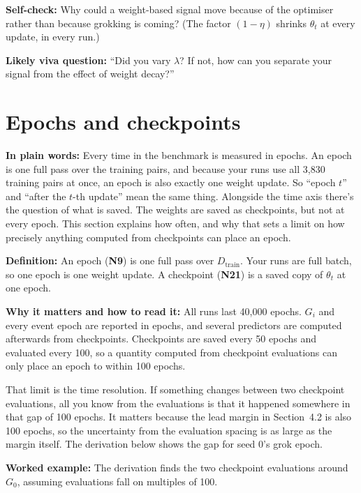 \documentclass[11pt,a4paper,oneside,openany]{report}
\newcommand{\Dtrain}{D_{\mathrm{train}}}
\newcommand{\gl}[1]{\textbf{#1}}   %
\newcommand{\fplain}{\textbf{In plain words:} }
\newcommand{\fdef}{\textbf{Definition:} }
\newcommand{\fread}{\par\textbf{Why it matters and how to read it:} }
\newcommand{\fex}{\par\textbf{Worked example:} }
\newcommand{\fself}{\par\textbf{Self-check:} }
\newcommand{\fviva}{\par\textbf{Likely viva question:} }
\begin{document}
\fself Why could a weight-based signal move because of the optimiser rather than because grokking is coming? (The factor $(1 - \eta)$ shrinks $\theta_t$ at every update, in every run.)
\fviva ``Did you vary $\lambda$? If not, how can you separate your signal from the effect of weight decay?''

\section{Epochs and checkpoints}
\fplain Every time in the benchmark is measured in epochs. An epoch is one full pass over the training pairs, and because your runs use all 3{,}830 training pairs at once, an epoch is also exactly one weight update. So ``epoch $t$'' and ``after the $t$-th update'' mean the same thing. Alongside the time axis there's the question of what is saved. The weights are saved as checkpoints, but not at every epoch. This section explains how often, and why that sets a limit on how precisely anything computed from checkpoints can place an epoch.

\fdef An epoch (\gl{N9}) is one full pass over $\Dtrain$. Your runs are full batch, so one epoch is one weight update. A checkpoint (\gl{N21}) is a saved copy of $\theta_t$ at one epoch.
\fread All runs last 40{,}000 epochs. $G_i$ and every event epoch are reported in epochs, and several predictors are computed afterwards from checkpoints. Checkpoints are saved every 50 epochs and evaluated every 100, so a quantity computed from checkpoint evaluations can only place an epoch to within 100 epochs.

That limit is the time resolution. If something changes between two checkpoint evaluations, all you know from the evaluations is that it happened somewhere in that gap of 100 epochs. It matters because the lead margin in Section~4.2 is also 100 epochs, so the uncertainty from the evaluation spacing is as large as the margin itself. The derivation below shows the gap for seed 0's grok epoch.

\fex The derivation finds the two checkpoint evaluations around $G_0$, assuming evaluations fall on multiples of 100.
\end{document}
